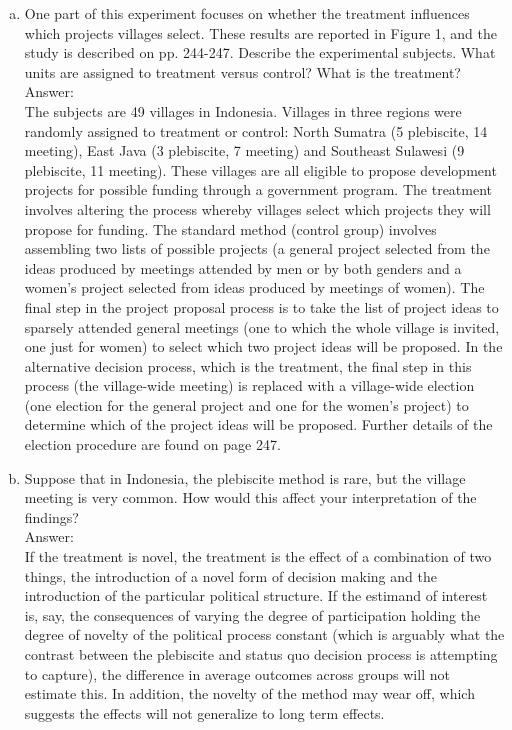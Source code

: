 \documentclass[11pt,notitlepage]{article}\usepackage[]{graphicx}\usepackage[]{color}
\begin{document}
\begin{enumerate}[a)]

\item One part of this experiment focuses on whether the treatment influences which projects villages select. These results are reported in Figure 1, and the study is described on pp. 244-247. Describe the experimental subjects. What units are assigned to treatment versus control? What is the treatment?\\
Answer:\\

The subjects are 49 villages in Indonesia. Villages in three regions were randomly assigned to treatment or control: North Sumatra (5 plebiscite, 14 meeting), East Java (3 plebiscite, 7 meeting) and Southeast Sulawesi (9 plebiscite, 11 meeting). These villages are all eligible to propose development projects for possible funding through a government program. The treatment involves altering the process whereby villages select which projects they will propose for funding. The standard method (control group) involves assembling two lists of possible projects (a general project selected from the ideas produced by meetings attended by men or by both genders and a women's project selected from ideas produced by meetings of women). The final step in the project proposal process is to take the list of project ideas to sparsely attended general meetings (one to which the whole village is invited, one just for women) to select which two project ideas will be proposed. In the alternative decision process, which is the treatment, the final step in this process (the village-wide meeting) is replaced with a village-wide election (one election for the general project and one for the women's project) to determine which of the project ideas will be proposed. Further details of the election procedure are found on page 247. 

\item Suppose that in Indonesia, the plebiscite method is rare, but the village meeting is very common. How would this affect your interpretation of the findings?\\
Answer:\\
If the treatment is novel, the treatment is the effect of a combination of two things, the introduction of a novel form of decision making and the introduction of the particular political structure. If the estimand of interest is, say, the consequences of varying the degree of participation holding the degree of novelty of the political process constant  (which is arguably what the contrast between the plebiscite and status quo decision process is attempting to capture), the difference in average outcomes across groups will not estimate this. In addition, the novelty of the method may wear off, which suggests the effects will not generalize to long term effects. 


\end{enumerate}
\end{document}
